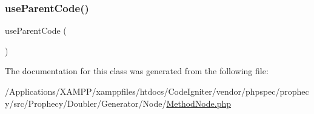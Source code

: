 \subsubsection{\texorpdfstring{use\+Parent\+Code()}{useParentCode()}}
{\footnotesize\ttfamily use\+Parent\+Code (\begin{DoxyParamCaption}{ }\end{DoxyParamCaption})}



The documentation for this class was generated from the following file\+:\begin{DoxyCompactItemize}
\item 
/\+Applications/\+X\+A\+M\+P\+P/xamppfiles/htdocs/\+Code\+Igniter/vendor/phpspec/prophecy/src/\+Prophecy/\+Doubler/\+Generator/\+Node/\mbox{\hyperlink{_method_node_8php}{Method\+Node.\+php}}\end{DoxyCompactItemize}
